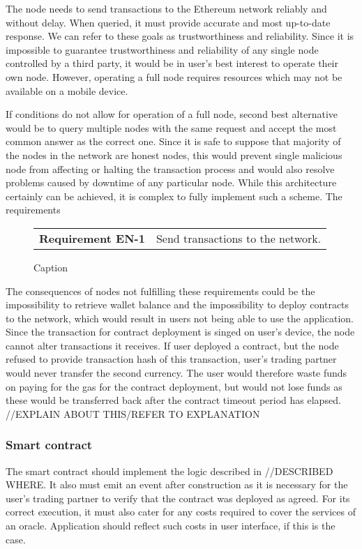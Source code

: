 The node needs to send transactions to the Ethereum network reliably and without delay. When queried, it must provide accurate and most up-to-date response. We can refer to these goals as trustworthiness and reliability. Since it is impossible to guarantee trustworthiness and reliability of any single node controlled by a third party, it would be in user’s best interest to operate their own node. However, operating a full node requires resources which may not be available on a mobile device.

If conditions do not allow for operation of a full node, second best alternative would be to query multiple nodes with the same request and accept the most common answer as the correct one. Since it is safe to suppose that majority of the nodes in the network are honest nodes, this would prevent single malicious node from affecting or halting the transaction process and would also resolve problems caused by downtime of any particular node. While this architecture certainly can be achieved, it is complex to fully implement such a scheme. The requirements 

\begin{figure}[ht]
    \begin{framed}
    \begin{tabular}{l l}
        \textbf{Requirement EN-1}&Send transactions to the network.\\
        
    \end{tabular}
    \end{framed}
   
    \caption{Caption}
    \label{fig:my_label}
\end{figure}

The consequences of nodes not fulfilling these requirements could be the impossibility to retrieve wallet balance and the impossibility to deploy contracts to the network, which would result in users not being able to use the application. Since the transaction for contract deployment is singed on user’s device, the node cannot alter transactions it receives. If user deployed a contract, but the node refused to provide transaction hash of this transaction, user’s trading partner would never transfer the second currency. The user would therefore waste funds on paying for the gas for the contract deployment, but would not lose funds as these would be transferred back after the contract timeout period has elapsed. //EXPLAIN ABOUT THIS/REFER TO EXPLANATION

\subsubsection{Smart contract}
The smart contract should implement the logic described in //DESCRIBED WHERE. It also must emit an event after construction as it is necessary for the user’s trading partner to verify that the contract was deployed as agreed. For its correct execution, it must also cater for any costs required to cover the services of an oracle. Application should reflect such costs in user interface, if this is the case.

